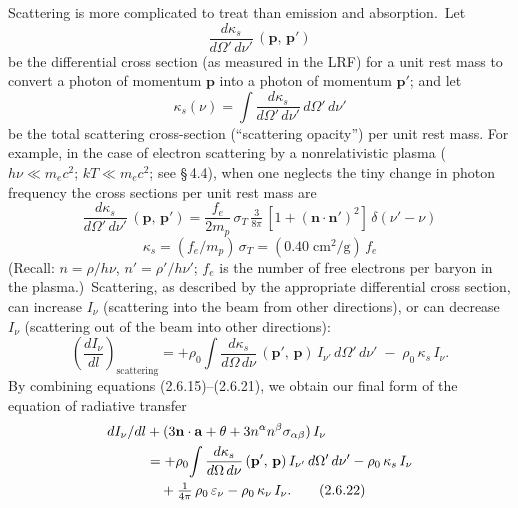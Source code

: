 Scattering is more complicated to treat than emission and absorption.\ Let
%
\begin{equation}
\frac{d\kappa_s}{d\Omega'\,d\nu'}\,(\mathbf{p},\,\mathbf{p}')
\tag{2.6.19}
\end{equation}
%
be the differential cross section (as measured in the LRF) for a unit rest mass to
convert a photon of momentum $\mathbf{p}$ into a photon of momentum $\mathbf{p}'$; and let
%
\[
\kappa_s(\nu) = \int \frac{d\kappa_s}{d\Omega'\,d\nu'}\,d\Omega'\,d\nu'
\]
%
be the total scattering cross-section (``scattering opacity'') per unit rest mass.
For example, in the case of electron scattering by a nonrelativistic plasma
($h\nu \ll m_e c^2$; $kT \ll m_e c^2$; see \S\,4.4), when one neglects the tiny change in photon
frequency the cross sections per unit rest mass are
%
\begin{equation}
\frac{d\kappa_s}{d\Omega'\,d\nu'}\,(\mathbf{p},\,\mathbf{p}')
  = \frac{f_e}{2m_p}\,\sigma_T\,\tfrac{3}{8\pi}\,
    [1 + (\mathbf{n} \cdot \mathbf{n}')^2]\,\delta(\nu' - \nu)
\tag{2.6.20}
\end{equation}
%
\[
\kappa_s = (f_e/m_p)\,\sigma_T = (0.40\;\mathrm{cm}^2/\mathrm{g})\,f_e
\]
%
(Recall: $n = \rho/h\nu$, $n' = \rho'/h\nu'$; $f_e$ is the number of free electrons per baryon in
the plasma.)\ Scattering, as described by the appropriate differential cross section,
can increase $I_\nu$ (scattering into the beam from other directions), or can decrease
$I_\nu$ (scattering out of the beam into other directions):
%
\begin{equation}
\left(\frac{dI_\nu}{dl}\right)_{\!\text{scattering}}
  = +\rho_0 \!\int \frac{d\kappa_s}{d\Omega\,d\nu}\,
    (\mathbf{p}',\,\mathbf{p})\,I_{\nu'}\,d\Omega'\,d\nu'
    \;-\; \rho_0\,\kappa_s\,I_\nu.
\tag{2.6.21}
\end{equation}
%
By combining equations (2.6.15)--(2.6.21), we obtain our final form of the
equation of radiative transfer
%
\begin{align}
dI_\nu/dl &+ (3\mathbf{n} \cdot \mathbf{a} + \theta
  + 3n^\alpha n^\beta \sigma_{\alpha\beta})\,I_\nu \notag\\
  &= +\rho_0 \!\int \frac{d\kappa_s}{d\Omega\,d\nu}\,
     (\mathbf{p}',\,\mathbf{p})\,I_{\nu'}\,d\Omega'\,d\nu'
     - \rho_0\,\kappa_s\,I_\nu \notag\\
  &\quad + \tfrac{1}{4\pi}\,\rho_0\,\varepsilon_\nu
     - \rho_0\,\kappa_\nu\,I_\nu.
\tag{2.6.22}
\end{align}


